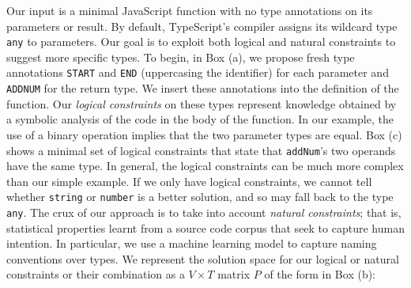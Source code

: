 \documentclass[sigplan,10pt,review,anonymous]{acmart} %
\theoremstyle{plain}
\theoremstyle{remark}
\theoremstyle{definition}
\begin{document}
\begin{figure*}
	\centering
	\def\svgwidth{0.75\linewidth}
	


	\vspace{.6em}
	\begin{minipage}{\textwidth}
		Our input is a minimal JavaScript function
		with no type annotations on its parameters or result.
		By default, TypeScript's compiler assigns its wildcard type \lstinline+any+ to
		parameters.
		Our goal is to exploit both logical and natural constraints to suggest
		more specific types.
		To begin, in Box (a), we propose fresh type annotations  \textcolor{mygreen}{\texttt{START}} and \textcolor{mygreen}{\texttt{END}} (uppercasing the identifier) for each parameter and \textcolor{mygreen}{\texttt{ADDNUM}} for the return type.
		We insert these annotations into the definition of the function.
		Our \emph{logical constraints} on these types represent knowledge obtained
		by a symbolic analysis of the code in the body of the function.
		In our example, the use of a binary operation implies that the two parameter types are equal.
		Box (c) shows a minimal set of logical constraints that state
		that \lstinline+addNum+'s two operands have the same type.
		In general, the logical constraints can be much more complex than our simple example.
		If we only have logical constraints, we cannot tell
		whether \lstinline{string} or \lstinline{number} is a better solution,
		and so may fall back to the type \lstinline{any}.
		The crux of our approach is to take into account \emph{natural constraints};
		that is, statistical properties learnt from a source code corpus that seek to
		capture human intention.
		In particular, we use a machine learning model to capture naming conventions over types.
		We represent the solution space for our logical or natural constraints
		or their combination
		as a $V \times T$ matrix $P$ of the form in Box (b):

\end{minipage}
\end{figure*}
\end{document}
